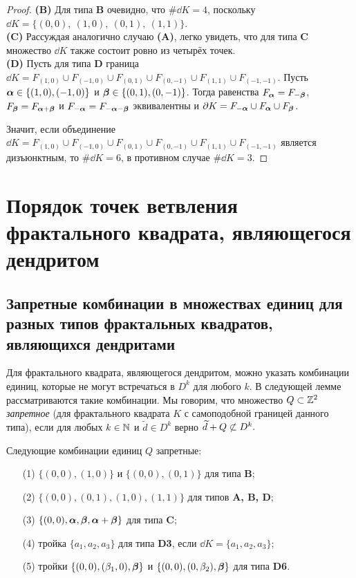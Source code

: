 \begin{proof}
{\bf (B)} Для типа {\bf B} очевидно, что $\#\dd K=4$, поскольку $\dd K=\{(0,0),\ (1,0),\ (0,1),\ (1,1)\}$.\\

{\bf (C)} Рассуждая аналогично случаю {\bf (A)}, легко увидеть, что для типа {\bf C} множество $\dd K$ также состоит ровно из четырёх точек. \\

{\bf (D)} Пусть для типа {\bf D} граница $\dd K=F_{(1,0)}\cup F_{(-1,0)}\cup F_{(0,1)}\cup F_{(0,-1)}\cup F_{(1,1)}\cup F_{(-1,-1)}$.
Пусть ${\bm{\alpha}}\in\{(1,0),(-1,0)\}$ и ${\bm{\beta}}\in\{(0,1),(0,-1)\}$.
Тогда равенства $F_{\bm{\alpha}}=F_{-{\bm{\beta}}}$, $F_{{\bm{\beta}}}=F_{{\bm{\alpha}}+{\bm{\beta}}}$ и $F_{-{\bm{\alpha}}}=F_{-{\bm{\alpha}}-{\bm{\beta}}}$ эквивалентны и $\partial K=F_{-{\bm{\alpha}}}\cup F_{\bm{\alpha}}\cup F_{\bm{\beta}}$. 

Значит, если объединение $\dd K=F_{(1,0)}\cup F_{(-1,0)}\cup F_{(0,1)}\cup F_{(0,-1)}\cup F_{(1,1)}\cup F_{(-1,-1)}$ является дизъюнктным, то $\#\dd K=6$, в противном случае $\#\dd K=3$.
\end{proof}


\section{Порядок точек ветвления фрактального квадрата, являющегося дендритом}

\subsection{Запретные комбинации в множествах единиц для разных типов фрактальных квадратов, являющихся дендритами}

Для фрактального квадрата, являющегося дендритом, можно указать комбинации единиц, которые не могут встречаться в $D^k$ для любого $k$. 
В следующей лемме рассматриваются такие комбинации. 
Мы говорим, что множество $Q\subset \mathbb{Z}^2$ {\em  запретное} (для фрактального квадрата $K$ с самоподобной границей данного типа), если для любых $k\in\mathbb{N}$ и $\widetilde d\in D^k$ верно
$\widetilde d+Q\not\subset D^k.$

\begin{lemma}\label{quadruples}
Следующие комбинации единиц $Q$ запретные:
\begin{itemize}[nolistsep]
\item[(1)] $\{(0,0), (1,0)\} $ и $\{(0,0), (0,1)\} $ для типа {\bf B};
\item[(2)] $\{(0,0), (0,1), (1,0), (1,1)\}$ для типов {\bf A, B, D};
\item[(3)] $\{(0,0),{\bm{\alpha}},{\bm{\beta}},{\bm{\alpha}}+{\bm{\beta}}\}$ для типа {\bf C};
\item[(4)] тройка $\{a_1, a_2, a_3\}$ для типа {\bf D3}, если $\dd K=\{a_1,a_2, a_3\}$;
\item[(5)] тройки $\{(0,0),(\beta_1,0),{\bm{\beta}}\}$ и $\{(0,0),(0,\beta_2),{\bm{\beta}}\}$ для типа {\bf D6}. 
\end{itemize}
\end{lemma}

